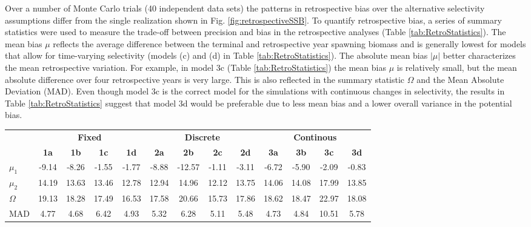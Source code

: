 Over a number of Monte Carlo trials (40 independent data sets) the patterns in retrospective bias over the alternative selectivity assumptions differ from the single realization shown in Fig. \ref{fig:retrospectiveSSB}.  To quantify retrospective bias, a series of summary statistics were used to measure the trade-off between precision and bias in the retrospective analyses (Table \ref{tab:RetroStatistics}).  The mean bias $\mu$ reflects the average difference between the terminal and retrospective year spawning biomass and is generally lowest for models that allow for time-varying selectivity (models (c) and (d) in Table \ref{tab:RetroStatistics}).  The absolute mean bias $|\mu|$ better characterizes the mean retrospective  variation.  For example, in model 3c (Table \ref{tab:RetroStatistics}) the mean bias $\mu$ is relatively small, but the mean absolute difference over four retrospective years is very large.  This is also reflected in the summary statistic $\Omega$ and the Mean Absolute Deviation (MAD).  Even though model 3c is the correct model for the simulations with continuous changes in selectivity, the results in Table \ref{tab:RetroStatistics} suggest that model 3d would be preferable due to less mean bias and a lower overall variance in the potential bias.  

\begin{table*}[!tbh]
	\caption{Retrospective bias statistics for each model run, where $\mu_1$ corresponds to the mean bias over four retrospective years, $\mu_2$ is the absolute mean, $\Omega$ is a combined measure of mean and absolute bias, and MAD is the Mean Absolute Deviation of $\mu_2$.  Lower MAD scores imply less variability in retrospective bias estimates.}
	\label{tab:RetroStatistics}
	\begin{center}
	\begin{footnotesize}
		
		\begin{tabular}{l|cccc|cccc|cccc}
		\hline

		\hline
		&\multicolumn{4}{c|}{\textbf{Fixed}} & \multicolumn{4}{c|}{\textbf{Discrete}} & \multicolumn{4}{c}{\textbf{Continous}} \\
		&\textbf{1a}  &\textbf{1b}  &\textbf{1c}  &\textbf{1d}  &\textbf{2a}   &\textbf{2b}  &\textbf{2c}  &\textbf{2d}  &\textbf{3a}  &\textbf{3b}  &\textbf{3c}  &\textbf{3d}\\
		\hline
		$\mu_1$     &-9.14& -8.26& -1.55& -1.77& -8.88& -12.57& -1.11& -3.11& -6.72& -5.90& -2.09& -0.83\\
		$\mu_2$ &14.19& 13.63& 13.46& 12.78& 12.94&  14.96& 12.12& 13.75& 14.06& 14.08& 17.99& 13.85\\
		$\Omega$  &19.13& 18.28& 17.49& 16.53& 17.58&  20.66& 15.73& 17.86& 18.62& 18.47& 22.97& 18.08\\
		MAD    & 4.77&  4.68&  6.42&  4.93&  5.32&   6.28&  5.11&  5.48&  4.73&  4.84& 10.51&  5.78\\

		\hline

		\hline
		\end{tabular}
	\end{footnotesize}
	\end{center}
\end{table*}


